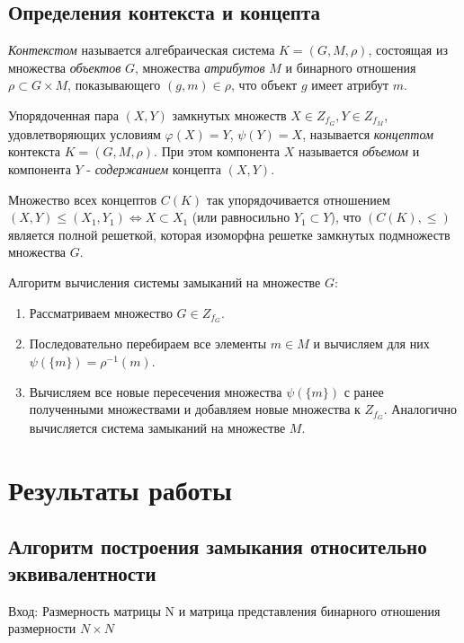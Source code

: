\documentclass[bachelor, och, labwork]{shiza}
\begin{document}
    \subsection{Определения контекста и концепта}

	\textit{Контекстом} называется алгебраическая система $K = (G, M, \rho)$, состоящая из множества \textit{объектов} $G$, множества \textit{атрибутов} $M$ и бинарного отношения $\rho \subset G \times M$, показывающего $(g, m) \in \rho$, что объект $g$ имеет атрибут $m$.
	
	Упорядоченная пара $(X, Y)$ замкнутых множеств $X \in Z_{f_G}, Y \in Z_{f_M}$, удовлетворяющих условиям $\varphi(X) = Y$, $\psi(Y) = X$, называется \textit{концептом} контекста $K = (G, M, \rho)$. При этом компонента $X$ называется \textit{объемом} и компонента $Y$ - \textit{содержанием} концепта $(X, Y)$.
	
	Множество всех концептов $C(K)$ так упорядочивается отношением \\ $(X, Y) \leq (X_1, Y_1) \Leftrightarrow X \subset X_1$ (или равносильно $Y_1 \subset Y$), что $(C(K), \leq)$ является полной решеткой, которая изоморфна решетке замкнутых подмножеств множества $G$.
	
	Алгоритм вычисления системы замыканий на множестве $G$:
	\begin{enumerate}
		\item Рассматриваем множество $G \in Z_{f_G}$.
		\item Последовательно перебираем все элементы $m \in M$ и вычисляем для них $\psi(\{m\}) = \rho^{-1}(m)$.
		\item Вычисляем все новые пересечения множества $\psi(\{m\})$ с ранее полученными множествами и добавляем новые множества к $Z_{f_G}$. Аналогично вычисляется система замыканий на множестве $M$.
	\end{enumerate}
	
	
	\section{Результаты работы}
	
	\subsection{Алгоритм построения замыкания относительно эквивалентности}
	
	$\textit{Вход:}$ Размерность матрицы N и матрица представления бинарного отношения размерности $N \times N$
	
\end{document}
